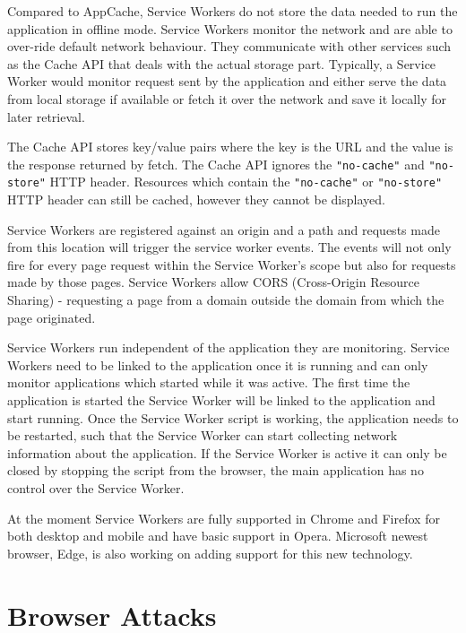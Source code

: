 \documentclass[10pt,a4paper,twoside]{book}
\begin{document}
Compared to AppCache, Service Workers do not store the data needed to run the application in offline mode. Service Workers monitor the network and are able to over-ride default network behaviour. They communicate with other services such as the Cache API that deals with the actual storage part. Typically, a Service Worker would monitor request sent by the application and either serve the data from local storage if available or fetch it over the network and save it locally for later retrieval. 

The Cache API stores key/value pairs where the key is the URL and the value is the response returned by fetch. The Cache API ignores the \texttt{"no-cache"} and \texttt{"no-store"} HTTP header. Resources which contain the \texttt{"no-cache"} or \texttt{"no-store"} HTTP header can still be cached, however they cannot be displayed. 

Service Workers are registered against an origin and a path and requests made from this location will trigger the service worker events. The events will not only fire for every page request within the Service Worker's scope but also for requests made by those pages. Service Workers allow CORS (Cross-Origin Resource Sharing) - requesting a page from a domain outside the domain from which the page originated.

Service Workers run independent of the application they are monitoring. Service Workers need to be linked to the application once it is running and can only monitor applications which started while it was active. The first time the application is started the Service Worker will be linked to the application and start running. Once the Service Worker script is working, the application needs to be restarted, such that the Service Worker can start collecting network information about the application. If the Service Worker is active it can only be closed by stopping the script from the browser, the main application has no control over the Service Worker.

At the moment Service Workers are fully supported in Chrome and Firefox for both desktop and mobile and have basic support in Opera. Microsoft newest browser, Edge, is also working on adding support for this new technology.

\section{Browser Attacks}
\end{document}
